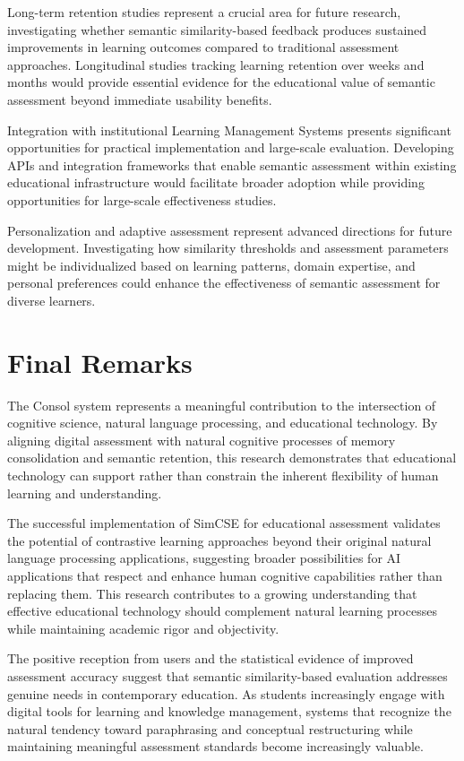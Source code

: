 {Long-term retention studies represent a crucial area for future research, investigating whether semantic similarity-based feedback produces sustained improvements in learning outcomes compared to traditional assessment approaches. Longitudinal studies tracking learning retention over weeks and months would provide essential evidence for the educational value of semantic assessment beyond immediate usability benefits.

Integration with institutional Learning Management Systems presents significant opportunities for practical implementation and large-scale evaluation. Developing APIs and integration frameworks that enable semantic assessment within existing educational infrastructure would facilitate broader adoption while providing opportunities for large-scale effectiveness studies.

Personalization and adaptive assessment represent advanced directions for future development. Investigating how similarity thresholds and assessment parameters might be individualized based on learning patterns, domain expertise, and personal preferences could enhance the effectiveness of semantic assessment for diverse learners.

\section{Final Remarks}

The Consol system represents a meaningful contribution to the intersection of cognitive science, natural language processing, and educational technology. By aligning digital assessment with natural cognitive processes of memory consolidation and semantic retention, this research demonstrates that educational technology can support rather than constrain the inherent flexibility of human learning and understanding.

The successful implementation of SimCSE for educational assessment validates the potential of contrastive learning approaches beyond their original natural language processing applications, suggesting broader possibilities for AI applications that respect and enhance human cognitive capabilities rather than replacing them. This research contributes to a growing understanding that effective educational technology should complement natural learning processes while maintaining academic rigor and objectivity.

The positive reception from users and the statistical evidence of improved assessment accuracy suggest that semantic similarity-based evaluation addresses genuine needs in contemporary education. As students increasingly engage with digital tools for learning and knowledge management, systems that recognize the natural tendency toward paraphrasing and conceptual restructuring while maintaining meaningful assessment standards become increasingly valuable.

}
